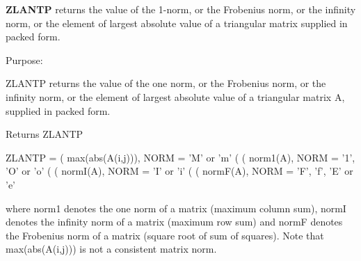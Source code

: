 {\bfseries Z\+L\+A\+N\+T\+P} returns the value of the 1-\/norm, or the Frobenius norm, or the infinity norm, or the element of largest absolute value of a triangular matrix supplied in packed form. 

 \begin{DoxyParagraph}{Purpose\+: }
\begin{DoxyVerb} ZLANTP  returns the value of the one norm,  or the Frobenius norm, or
 the  infinity norm,  or the  element of  largest absolute value  of a
 triangular matrix A, supplied in packed form.\end{DoxyVerb}

\end{DoxyParagraph}
\begin{DoxyReturn}{Returns}
Z\+L\+A\+N\+T\+P \begin{DoxyVerb}    ZLANTP = ( max(abs(A(i,j))), NORM = 'M' or 'm'
             (
             ( norm1(A),         NORM = '1', 'O' or 'o'
             (
             ( normI(A),         NORM = 'I' or 'i'
             (
             ( normF(A),         NORM = 'F', 'f', 'E' or 'e'

 where  norm1  denotes the  one norm of a matrix (maximum column sum),
 normI  denotes the  infinity norm  of a matrix  (maximum row sum) and
 normF  denotes the  Frobenius norm of a matrix (square root of sum of
 squares).  Note that  max(abs(A(i,j)))  is not a consistent matrix norm.\end{DoxyVerb}
 
\end{DoxyReturn}

